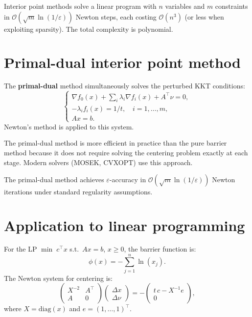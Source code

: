 \begin{theorem}
Interior point methods solve a linear program with $n$ variables and $m$
constraints in $\mathcal{O}(\sqrt{m} \ln(1/\varepsilon))$ Newton steps, each
costing $\mathcal{O}(n^3)$ (or less when exploiting sparsity). The total
complexity is polynomial.
\end{theorem}

\section{Primal-dual interior point method}

\begin{definition}
The \textbf{primal-dual} method simultaneously solves the perturbed KKT
conditions:
\[
  \begin{cases}
    \nabla f_0(x) + \sum_i \lambda_i \nabla f_i(x) + A^\top \nu = 0, \\
    -\lambda_i f_i(x) = 1/t, \quad i = 1, \ldots, m, \\
    Ax = b.
  \end{cases}
\]
Newton's method is applied to this system.
\end{definition}

\begin{remark}
The primal-dual method is more efficient in practice than the pure barrier
method because it does not require solving the centering problem exactly at
each stage. Modern solvers (MOSEK, CVXOPT) use this approach.
\end{remark}

\begin{theorem}
The primal-dual method achieves $\varepsilon$-accuracy in
$\mathcal{O}(\sqrt{m} \ln(1/\varepsilon))$ Newton iterations under standard
regularity assumptions.
\end{theorem}

\section{Application to linear programming}

\begin{example}
For the LP $\min\; c^\top x$ s.t.\ $Ax = b$, $x \geq 0$, the barrier
function is:
\[
  \phi(x) = -\sum_{j=1}^n \ln(x_j).
\]
The Newton system for centering is:
\[
  \begin{pmatrix}
    X^{-2} & A^\top \\
    A & 0
  \end{pmatrix}
  \begin{pmatrix} \Delta x \\ \Delta \nu \end{pmatrix}
  = -\begin{pmatrix} t\, c - X^{-1} e \\ 0 \end{pmatrix},
\]
where $X = \mathrm{diag}(x)$ and $e = (1, \ldots, 1)^\top$.
\end{example}

